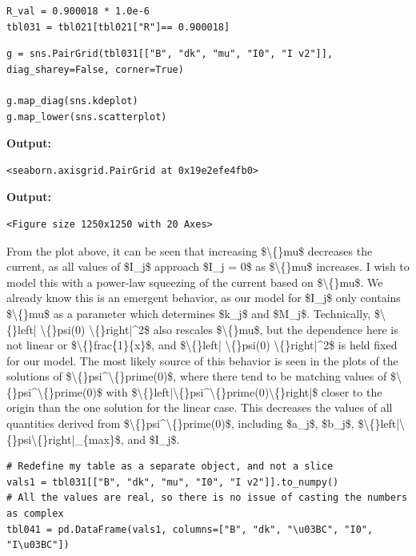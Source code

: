 \documentclass{article}
\begin{document}
\begin{lstlisting}
R_val = 0.900018 * 1.0e-6
tbl031 = tbl021[tbl021["R"]== 0.900018]\end{lstlisting}

\begin{lstlisting}
g = sns.PairGrid(tbl031[["B", "dk", "mu", "I0", "I v2"]], diag_sharey=False, corner=True)

g.map_diag(sns.kdeplot)
g.map_lower(sns.scatterplot)\end{lstlisting}

\textbf{Output:}\begin{verbatim}
<seaborn.axisgrid.PairGrid at 0x19e2efe4fb0>
\end{verbatim}

\textbf{Output:}\begin{verbatim}
<Figure size 1250x1250 with 20 Axes>
\end{verbatim}

From the plot above, it can be seen that increasing \$\textbackslash\{\}mu\$ decreases the current, as all values of \$I\_j\$ approach \$I\_j = 0\$ as \$\textbackslash\{\}mu\$ increases. I wish to model this with a power-law squeezing of the current based on \$\textbackslash\{\}mu\$. We already know this is an emergent behavior, as our model for \$I\_j\$ only contains \$\textbackslash\{\}mu\$ as a parameter which determines \$k\_j\$ and \$M\_j\$. Technically, \$\textbackslash\{\}left| \textbackslash\{\}psi(0) \textbackslash\{\}right|\textasciicircum{}2\$ also rescales \$\textbackslash\{\}mu\$, but the dependence here is not linear or \$\textbackslash\{\}frac\{1\}\{x\}\$, and \$\textbackslash\{\}left| \textbackslash\{\}psi(0) \textbackslash\{\}right|\textasciicircum{}2\$ is held fixed for our model. The most likely source of this behavior is seen in the plots of the solutions of \$\textbackslash\{\}psi\textasciicircum{}\textbackslash\{\}prime(0)\$, where there tend to be matching values of \$\textbackslash\{\}psi\textasciicircum{}\textbackslash\{\}prime(0)\$ with \$\textbackslash\{\}left|\textbackslash\{\}psi\textasciicircum{}\textbackslash\{\}prime(0)\textbackslash\{\}right|\$ closer to the origin than the one solution for the linear case. This decreases the values of all quantities derived from \$\textbackslash\{\}psi\textasciicircum{}\textbackslash\{\}prime(0)\$, including \$a\_j\$, \$b\_j\$, \$\textbackslash\{\}left|\textbackslash\{\}psi\textbackslash\{\}right|\_\{max\}\$, and \$I\_j\$.

\begin{lstlisting}
# Redefine my table as a separate object, and not a slice
vals1 = tbl031[["B", "dk", "mu", "I0", "I v2"]].to_numpy()
# All the values are real, so there is no issue of casting the numbers as complex
tbl041 = pd.DataFrame(vals1, columns=["B", "dk", "\u03BC", "I0", "I\u03BC"])\end{lstlisting}
\end{document}
